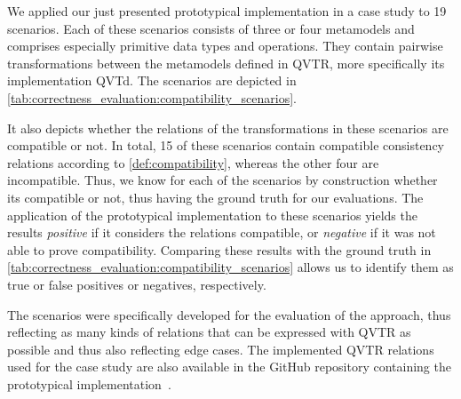 We applied our just presented prototypical implementation in a case study to 19 scenarios.
Each of these scenarios consists of three or four metamodels and comprises especially primitive data types and operations.
They contain pairwise transformations between the metamodels defined in \gls{QVTR}, more specifically its implementation \gls{QVTd}.
The scenarios are depicted in \autoref{tab:correctness_evaluation:compatibility_scenarios}.

It also depicts whether the relations of the transformations in these scenarios are compatible or not.
In total, 15 of these scenarios contain compatible consistency relations according to \autoref{def:compatibility}, whereas the other four are incompatible.
Thus, we know for each of the scenarios by construction whether its compatible or not, thus having the ground truth for our evaluations.
The application of the prototypical implementation to these scenarios yields the results \emph{positive} if it considers the relations compatible, or \emph{negative} if it was not able to prove compatibility.
Comparing these results with the ground truth in \autoref{tab:correctness_evaluation:compatibility_scenarios} allows us to identify them as true or false positives or negatives, respectively.

The scenarios were specifically developed for the evaluation of the approach, thus reflecting as many kinds of relations that can be expressed with \gls{QVTR} as possible and thus also reflecting edge cases.
The implemented \gls{QVTR} relations used for the case study are also available in the GitHub repository containing the prototypical implementation~\cite{decompositionGithub}.




